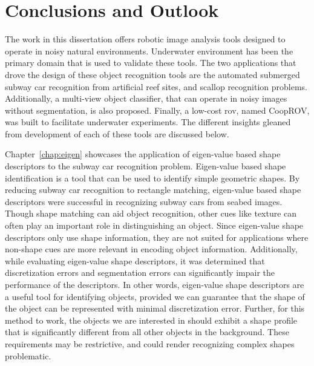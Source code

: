 
\chapter{Conclusions and Outlook}
\label{chap:thesis_conclusion}


The work in this dissertation offers robotic image analysis tools designed to operate in noisy natural environments. 
Underwater environment has been the primary domain that is used to validate these tools.
The two applications that drove the design of these object recognition tools are the automated submerged subway car recognition
from artificial reef sites, and scallop recognition problems.
Additionally, a multi-view object classifier, that can operate in noisy images without segmentation, is also proposed.
Finally, a low-cost \gls{rov}, named CoopROV, was built to facilitate underwater experiments. The different insights gleaned from development of each of these tools are discussed below.

Chapter~\ref{chap:eigen} showcases the application of eigen-value based shape descriptors to the subway car recognition problem. 
Eigen-value based shape identification is a tool that can be used to identify simple geometric shapes. 
By reducing subway car recognition to rectangle matching, eigen-value based shape descriptors were
successful in recognizing subway cars from seabed images.
Though shape matching can aid object recognition, other cues like texture can often play an important role
in distinguishing an object. Since eigen-value shape descriptors only use shape information, 
they are not suited for applications where non-shape cues are more relevant in encoding object information. 
Additionally, while evaluating eigen-value shape descriptors, it was determined that 
discretization errors and segmentation errors can significantly impair the performance of the descriptors.
In other words, eigen-value shape descriptors are a useful tool for identifying
objects, provided we can guarantee that the shape of the object can be represented with minimal discretization error. 
Further, for this method to work, the objects
we are interested in should exhibit a shape profile that is significantly different from
all other objects in the background. These requirements may be restrictive, and could render recognizing 
complex shapes problematic. 

